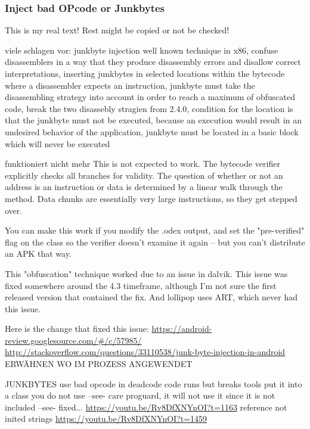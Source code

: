 \subsubsection{Inject bad OPcode or Junkbytes} \label{subsubsection:counter-reengineering-break-inject}
This is my real text! Rest might be copied or not be checked!


%
viele schlagen vor:
junkbyte injection
well known technique in x86, confuse disassemblers in a way that they produce disassembly errors and disallow correct interpretations, inserting junkbytes in selected locations within the bytecode where a disassembler expects an instruction, junkbyte must take the disassembling strategy into account in order to reach a maximum of obfuscated code, break the two disassebly stragien from 2.4.0, condition for the location is that the junkbyte must not be executed, because an execution would result in an undesired behavior of the application,  junkbyte must be located in a basic block which will never be executed
\cite{schulzLabCourse}
%


funktioniert nicht mehr
This is not expected to work. The bytecode verifier explicitly checks all branches for validity. The question of whether or not an address is an instruction or data is determined by a linear walk through the method. Data chunks are essentially very large instructions, so they get stepped over.

You can make this work if you modify the .odex output, and set the "pre-verified" flag on the class so the verifier doesn't examine it again -- but you can't distribute an APK that way.

This "obfuscation" technique worked due to an issue in dalvik. This issue was fixed somewhere around the 4.3 timeframe, although I'm not sure the first released version that contained the fix. And lollipop uses ART, which never had this issue.

Here is the change that fixed this issue: \url{https://android-review.googlesource.com/#/c/57985/}
\url{http://stackoverflow.com/questions/33110538/junk-byte-injection-in-android}
%
ERWÄHNEN WO IM PROZESS ANGEWENDET\newline

JUNKBYTES\newline
use bad opcode in deadcode \newline
code runs but breaks tools\newline
put it into a class you do not use --see- care proguard, it will not use it since it is not included\newline
--see- fixed...\newline
\url{https://youtu.be/Rv8DfXNYnOI?t=1163}\newline
reference not inited strings\newline
\url{https://youtu.be/Rv8DfXNYnOI?t=1459}
